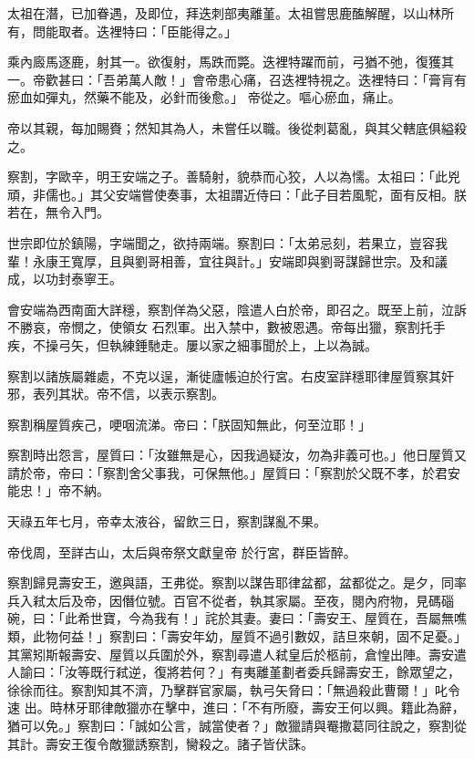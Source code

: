 \begin{pinyinscope}
 太祖在潛，已加眷遇，及即位，拜迭刺部夷離堇。太祖嘗思鹿醢解醒，以山林所有，問能取者。迭裡特曰：「臣能得之。」



 乘內廄馬逐鹿，射其一。欲復射，馬跌而斃。迭裡特躍而前，弓猶不弛，復獲其一。帝歡甚曰：「吾弟萬人敵！」會帝患心痛，召迭裡特視之。迭裡特曰：「膏肓有瘀血如彈丸，然藥不能及，必針而後愈。」
 帝從之。嘔心瘀血，痛止。



 帝以其親，每加賜賚；然知其為人，未嘗任以職。後從刺葛亂，與其父轄底俱縊殺之。



 察割，字歐辛，明王安端之子。善騎射，貌恭而心狡，人以為懦。太祖曰：「此兇頑，非儒也。」其父安端嘗使奏事，太祖謂近侍曰：「此子目若風駝，面有反相。朕若在，無令入門。



 世宗即位於鎮陽，字端聞之，欲持兩端。察割曰：「太弟忌刻，若果立，豈容我輩！永康王寬厚，且與劉哥相善，宜往與計。」安端即與劉哥謀歸世宗。及和議成，以功封泰寧王。



 會安端為西南面大詳穩，察割佯為父惡，陰遣人白於帝，即召之。既至上前，泣訴不勝哀，帝憫之，使領女
 石烈軍。出入禁中，數被恩遇。帝每出獵，察割托手疾，不操弓矢，但執練錘馳走。屢以家之細事聞於上，上以為誠。



 察割以諸族屬雜處，不克以逞，漸徙廬帳迫於行宮。右皮室詳穩耶律屋質察其奸邪，表列其狀。帝不信，以表示察割。



 察割稱屋質疾己，哽咽流涕。帝曰：「朕固知無此，何至泣耶！」



 察割時出怨言，屋質曰：「汝雖無是心，因我過疑汝，勿為非義可也。」他日屋質又請於帝，帝曰：「察割舍父事我，可保無他。」屋質曰：「察割於父既不孝，於君安能忠！」帝不納。



 天祿五年七月，帝幸太液谷，留飲三日，察割謀亂不果。



 帝伐周，至詳古山，太后與帝祭文獻皇帝
 於行宮，群臣皆醉。



 察割歸見壽安王，邀與語，王弗從。察割以謀告耶律盆都，盆都從之。是夕，同率兵入弒太后及帝，因僭位號。百官不從者，執其家屬。至夜，閱內府物，見碼碯碗，曰：「此希世寶，今為我有！」詫於其妻。妻曰：「壽安王、屋質在，吾屬無噍類，此物何益！」察割曰：「壽安年幼，屋質不過引數奴，詰旦來朝，固不足憂。」其黨矧斯報壽安、屋質以兵圍於外，察割尋遣人弒皇后於柩前，倉惶出陣。壽安遣人諭曰：「汝等既行弒逆，復將若何？」有夷離堇劃者委兵歸壽安王，餘眾望之，徐徐而往。察割知其不濟，乃擊群官家屬，執弓矢脅曰：「無過殺此曹爾！」叱令速
 出。時林牙耶律敵獵亦在擊中，進曰：「不有所廢，壽安王何以興。籍此為辭，猶可以免。」察割曰：「誠如公言，誠當使者？」敵獵請與罨撒葛同往說之，察割從其計。壽安王復令敵獵誘察割，臠殺之。諸子皆伏誅。




\end{pinyinscope}
